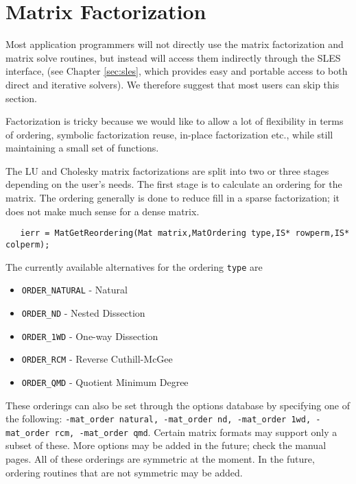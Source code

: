 \section{Matrix Factorization} 
\label{sec:matfactor}

Most application programmers will not directly use the matrix
factorization and matrix solve routines, but instead will access them
indirectly through the SLES interface, (see Chapter \ref{sec:sles},
which provides easy and portable access to both direct and iterative
solvers).  We therefore suggest that most users can skip this section.

\begin{design}
Factorization is tricky because we would like to allow a lot
of flexibility in terms of ordering, symbolic factorization 
reuse, in-place factorization etc., while still maintaining a
small set of functions. 
\end{design}

The LU and Cholesky 
matrix factorizations are split into 
two or three stages depending on the user's needs. The first stage is 
to calculate an ordering for the matrix.  The ordering generally is 
done to reduce fill in a sparse factorization; it does not make much 
sense for a dense matrix.  
\begin{verbatim}
   ierr = MatGetReordering(Mat matrix,MatOrdering type,IS* rowperm,IS* colperm); 
\end{verbatim}
The currently available alternatives for the ordering {\tt type} are 
\begin{itemize}
\item {\tt ORDER\_NATURAL} - Natural
\item {\tt ORDER\_ND} - Nested Dissection
\item {\tt ORDER\_1WD} - One-way Dissection
\item {\tt ORDER\_RCM} - Reverse Cuthill-McGee
\item {\tt ORDER\_QMD} - Quotient Minimum Degree
\end{itemize}
These orderings can also be set through the options database by specifying 
one of the following:  {\tt -mat\_order natural, -mat\_order nd, 
-mat\_order 1wd, -mat\_order rcm, -mat\_order qmd}.
Certain   
matrix   
  
 
formats may support only a subset of these. More options may 
be added in the future; check the manual pages. All of these orderings are 
symmetric at the moment. In the future, ordering routines that are 
not symmetric may be added.

